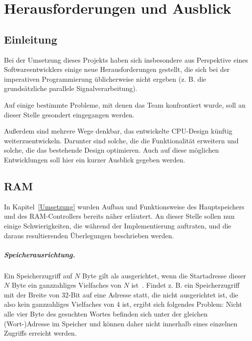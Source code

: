 \chapter{Herausforderungen und Ausblick} %
\label{Probleme} %

\section{Einleitung}

Bei der Umsetzung dieses Projekts haben sich insbesondere aus Perspektive eines Softwareentwicklers einige neue Herausforderungen gestellt, die sich bei der imperativen Programmierung üblicherweise nicht ergeben (z. B. die grundsätzliche parallele Signalverarbeitung).

Auf einige bestimmte Probleme, mit denen das Team konfrontiert wurde, soll an dieser Stelle gesondert eingegangen werden.

Außerdem sind mehrere Wege denkbar, das entwickelte CPU-Design künftig weiterzuentwickeln. Darunter sind solche, die die Funktionalität erweitern und solche, die das bestehende Design optimieren. Auch auf diese möglichen Entwicklungen soll hier ein kurzer Ausblick gegeben werden.

\section{RAM}

In Kapitel~\ref{Umsetzung} wurden Aufbau und Funktionsweise des Hauptspeichers und des RAM-Controllers bereits näher erläutert.
An dieser Stelle sollen nun einige Schwierigkeiten, die während der Implementierung auftraten, und die daraus resultierenden Überlegungen beschrieben werden.

\paragraph{Speicherausrichtung.} 
Ein Speicherzugriff auf $N$ Byte gilt als ausgerichtet, wenn die Startadresse dieser $N$ Byte ein ganzzahliges Vielfaches von $N$ ist~\cite[S. 96/97]{Hennessy}.
Findet z. B. ein Speicherzugriff mit der Breite von 32-Bit auf eine Adresse statt, die nicht ausgerichtet ist, die also kein ganzzahliges Vielfaches von 4 ist, ergibt sich folgendes Problem:
Nicht alle vier Byte des gesuchten Wortes befinden sich unter der gleichen (Wort-)Adresse im Speicher und können daher nicht innerhalb eines einzelnen Zugriffs erreicht werden.

